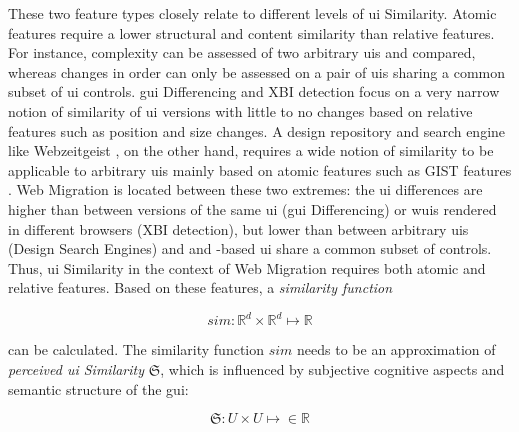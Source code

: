 These two feature types closely relate to different levels of \gls{ui} Similarity.
Atomic features require a lower structural and content similarity than relative features.
For instance, complexity can be assessed of two arbitrary \glspl{ui} and compared, whereas changes in order can only be assessed on a pair of \glspl{ui} sharing a common subset of \gls{ui} controls.
\gls{gui} Differencing and XBI detection focus on a very narrow notion of similarity of \gls{ui} versions with little to no changes based on relative features such as position and size changes.
A design repository and search engine like Webzeitgeist \autocite{Kumar2013Webzeitgeist}, on the other hand, requires a wide notion of similarity to be applicable to arbitrary \glspl{ui} mainly based on atomic features such as GIST features \autocite{Oliva2001GIST}.
\gls{Web Migration} is located between these two extremes: the \gls{ui} differences are higher than between versions of the same \gls{ui} (\gls{gui} Differencing) or \glspl{wui} rendered in different browsers (XBI detection), but lower than between arbitrary \glspl{ui} (Design Search Engines) and  and -based \gls{ui} share a common subset of controls.
Thus, \gls{ui} Similarity in the context of \gls{Web Migration} requires both atomic and relative features.
Based on these features, a \emph{similarity function}

\begin{equation}sim: \mathbb{R}^d \times \mathbb{R}^d \mapsto \mathbb{R}\label{eq:sim}\end{equation}

can be calculated.
The similarity function \(sim\) needs to be an approximation of \emph{perceived \gls{ui} Similarity} \(\mathfrak{S}\), which is influenced by subjective cognitive aspects \autocite{Bakaev2017Kansei} and semantic structure of the \gls{gui}:

\begin{equation}\mathfrak{S}: U \times U \mapsto \in \mathbb{R}\label{eq:perceived-sim}\end{equation}

